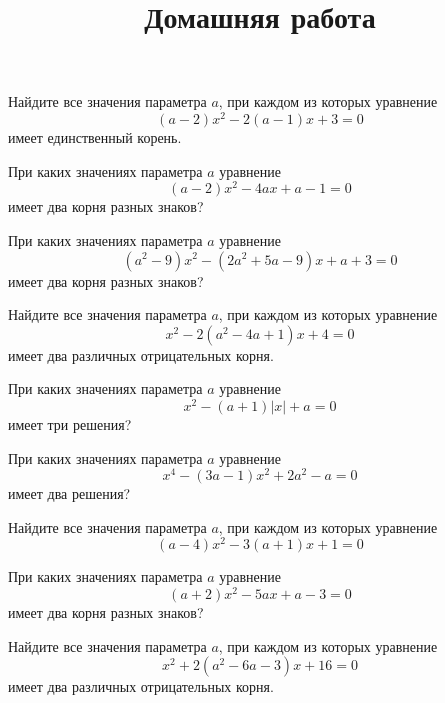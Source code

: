 \begin{class}[number=доп. занятие]
	\begin{listofex}
		\item Найдите все значения параметра \( a \), при каждом из которых уравнение
		\[ (a-2)x^2-2(a-1)x+3=0 \]
		имеет единственный корень.
		\item При каких значениях параметра \( a \) уравнение
		\[ (a-2)x^2-4ax+a-1=0 \]
		имеет два корня разных знаков?
		\item При каких значениях параметра \( a \) уравнение
		\[ (a^2-9)x^2-(2a^2+5a-9)x+a+3=0 \]
		имеет два корня разных знаков?
		\item Найдите все значения параметра \( a \), при каждом из которых уравнение
		\[ x^2-2(a^2-4a+1)x+4=0 \]
		имеет два различных отрицательных корня.
		\item При каких значениях параметра \( a \) уравнение
		\[ x^2-(a+1)|x|+a=0 \]
		имеет три решения?
		\item При каких значениях параметра \( a \) уравнение
		\[ x^4-(3a-1)x^2+2a^2-a=0 \]
		имеет два решения?
	\end{listofex}
	\newpage
	\title{Домашняя работа}
	\begin{listofex}
		\item Найдите все значения параметра \( a \), при каждом из которых уравнение
		\[ (a-4)x^2-3(a+1)x+1=0 \]
		\item При каких значениях параметра \( a \) уравнение
		\[ (a+2)x^2-5ax+a-3=0 \]
		имеет два корня разных знаков?
		\item Найдите все значения параметра \( a \), при каждом из которых уравнение
		\[ x^2+2(a^2-6a-3)x+16=0 \]
		имеет два различных отрицательных корня.
	\end{listofex}
\end{class}